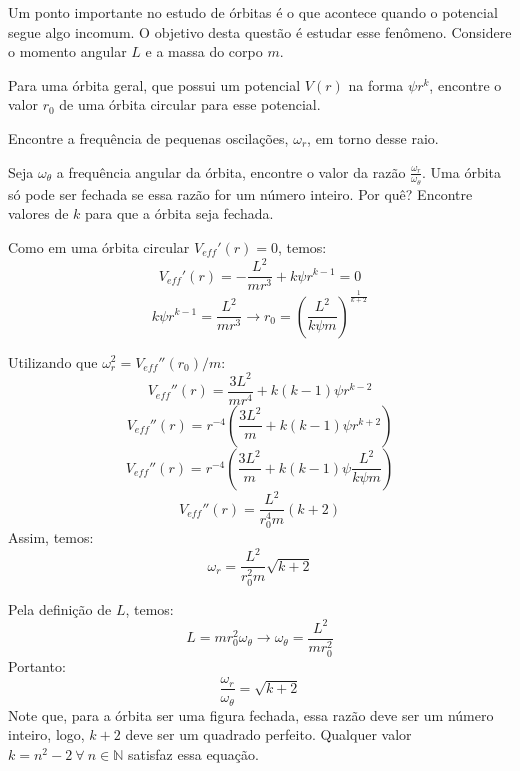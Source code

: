 \documentclass[11pt]{article}
\begin{document}
\begin{pproblem} Um ponto importante no estudo de órbitas é o que acontece quando o potencial segue algo incomum. O objetivo desta questão é estudar esse fenômeno. Considere o momento angular \(L\) e a massa do corpo \(m\).
    \begin{alternativas}
        \item Para uma órbita geral, que possui um potencial \(V(r)\) na forma \(\psi r^k\), encontre o valor \(r_0\) de uma órbita circular para esse potencial.
        
        \item Encontre a frequência de pequenas oscilações, \(\omega_r\), em torno desse raio. 
        
        \item Seja \(\omega_\theta\) a frequência angular da órbita, encontre o valor da razão \(\frac{\omega_r}{\omega_\theta}\). Uma órbita só pode ser fechada se essa razão for um número inteiro. Por quê? Encontre valores de \(k\) para que a órbita seja fechada.
         
    \end{alternativas} 

    \begin{pssolution*}{}{}
        \begin{alternativas}
            \item Como em uma órbita circular \(V_{eff}'(r) = 0\), temos:
            \[V_{eff}'(r) = -\frac{L^2}{mr^3}+k\psi r^{k-1} = 0\]
            \[k\psi r^{k-1} = \frac{L^2}{mr^3} \rightarrow \boxed{r_0 = \left(\frac{L^2}{k\psi m}\right)^{\frac{1}{k+2}}}\]
        
            \item Utilizando que \(\omega_r^2=V_{eff}''(r_0)/m\):
            \[V_{eff}''(r) = \frac{3L^2}{mr^4}+k(k-1)\psi r^{k-2}\]
            \[V_{eff}''(r) = r^{-4}\left(\frac{3L^2}{m}+k(k-1)\psi r^{k+2}\right)\]
            \[V_{eff}''(r) = r^{-4}\left(\frac{3L^2}{m}+k(k-1)\psi \frac{L^2}{k\psi m}\right)\]
            \[V_{eff}''(r) = \frac{L^2}{r_0^4m}(k+2)\]
            Assim, temos:
            \[\boxed{\omega_r = \frac{L^2}{r_0^2m}\sqrt{k+2}}\]

            \item Pela definição de \(L\), temos:
            \[L = mr_0^2\omega_\theta \rightarrow \omega_\theta = \frac{L^2}{mr_0^2}\]
            Portanto:
            \[\frac{\omega_r}{\omega_\theta} = \sqrt{k+2}\]
            Note que, para a órbita ser uma figura fechada, essa razão deve ser um número inteiro, logo, \(k+2\) deve ser um quadrado perfeito. Qualquer valor \(k = n^2-2 \ \forall \ n \in \mathbb{N}\) satisfaz essa equação.
        \end{alternativas}
    \end{pssolution*}
\end{pproblem}
\end{document}
